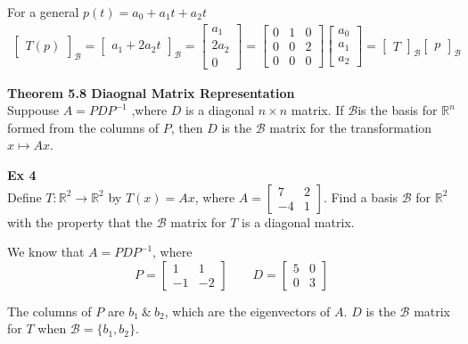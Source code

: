 \documentclass{article}
\begin{document}
  For a general $ p(t)=a_0+a_1t+a_2t^{} $ 
  \[
    \begin{gathered}
    \begin{bmatrix}
      T(p)
    \end{bmatrix}_\mathcal{B}=\begin{bmatrix}
      a_1+2a_2t
    \end{bmatrix}_\mathcal{B}=\begin{bmatrix}
      a_1\\
      2a_2\\
      0
    \end{bmatrix}=
    \begin{bmatrix}
      0 &1 &0\\
      0 &0 &2\\
      0 &0 &0
    \end{bmatrix}
    \begin{bmatrix}
      a_0\\
      a_1\\
      a_2
    \end{bmatrix}=
    \begin{bmatrix}
      T
    \end{bmatrix}_\mathcal{B}
    \begin{bmatrix}
      p
    \end{bmatrix}_\mathcal{B}
    \end{gathered}
  \]

  \textbf{Theorem 5.8 Diaognal Matrix Representation}\\
  Suppouse $ A=PDP^{-1} $ ,where $ D $ is a diagonal $ n\times n $ matrix. If $ \mathcal{B} $is the basis for $ \mathbb{R}^{n} $ formed from the columns of $ P $, then $ D $  is the $ \mathcal{B} $ matrix for the transformation $ x\mapsto Ax $. 

  \textbf{Ex 4}\\
  Define $ T:\mathbb{R}^{2}\to \mathbb{R}^{2} $ by $ T(x)=Ax $, where $ A=\begin{bmatrix}
    7 &2\\
    -4 &1
  \end{bmatrix} $. Find a basis $ \mathcal{B} $ for $ \mathbb{R}^{2} $ with the property that the $ \mathcal{B} $ matrix for $ T $ is a diagonal matrix.

  We know that $ A=PDP^{-1} $, where
  \[
    P=\begin{bmatrix}
      1 &1\\
      -1 &-2
    \end{bmatrix} \qquad 
    D=\begin{bmatrix}
      5 &0\\
      0 &3
    \end{bmatrix}
  \]

  The columns of $ P $ are $ b_1 ~\&~ b_2 $, which are the eigenvectors of $ A $. $ D $ is the $ \mathcal{B} $ matrix for $ T $ when $ \mathcal{B}=\{ b_1,b_2 \} $. 
\end{document}
